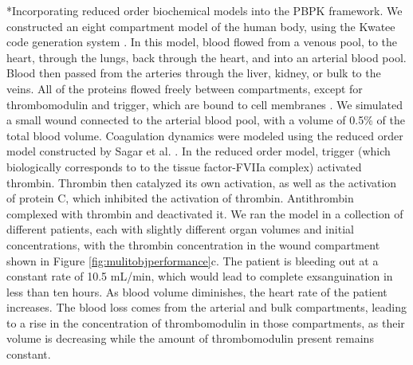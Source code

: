 \documentclass[11pt]{article}
\makeatletter
\renewcommand\paragraph{\@startsection
  {paragraph}{2}{0mm}
  {-0.05in}
  {-0.5\baselineskip}
  {\normalfont\normalsize\itshape}}
\makeatother
\begin{document}
\paragraph*{Incorporating reduced order biochemical models into the PBPK framework.}
We constructed an eight compartment model of the human body, using the Kwatee code generation system \citep{varnerlab_2015_32628}.
In this model, blood flowed from a venous pool, to the heart, through the lungs, back through the heart, and into an arterial blood pool.
Blood then passed from the arteries through the liver, kidney, or bulk to the veins. All of the proteins flowed freely between compartments, except for thrombomodulin and trigger, which are bound to cell membranes \cite{esmon1989roles}. We simulated a small wound connected to the arterial blood pool, with a volume of 0.5\% of the total blood volume. Coagulation dynamics were modeled using the reduced order model constructed by Sagar et al. \cite{sagar2015dynamic}. In the reduced order model, trigger (which biologically corresponds to to the tissue factor-FVIIa complex) activated thrombin. Thrombin then catalyzed its own activation, as well as the activation of protein C, which inhibited the activation of thrombin. Antithrombin complexed with thrombin and deactivated it. We ran the model in a collection of different patients, each with slightly different organ volumes and initial concentrations, with the thrombin concentration in the wound compartment shown in Figure \ref{fig:mulitobjperformance}c. The patient is bleeding out at a constant rate of 10.5 mL/min, which would lead to complete exsanguination in less than ten hours. As blood volume diminishes, the heart rate of the patient increases.
The blood loss comes from the arterial and bulk compartments, leading to a rise in the concentration of thrombomodulin in those compartments, as their volume is decreasing while the amount of thrombomodulin present remains constant.

\end{document}
